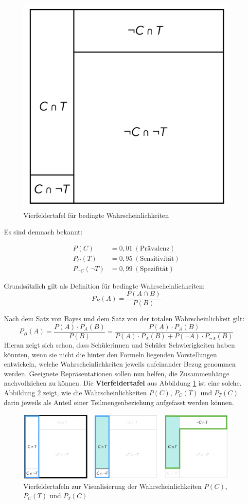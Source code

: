 \documentclass[
]{scrbook}
\theoremstyle{definition}
\theoremstyle{definition}
\theoremstyle{definition}
\theoremstyle{definition}
\theoremstyle{remark}
\begin{document}
\begin{figure}

{\centering \includegraphics[width=0.5\linewidth]{pictures/12-Vierfeld} 

}

\caption{Vierfeldertafel für bedingte Wahrscheinlichkeiten}\label{fig:Vierfeld}
\end{figure}

Es sind demnach bekannt:

\begin{align}
P(C) &= 0,\!01 \ \mathrm{(Prävalenz)}\\
P_C(T) &= 0,\!95 \ \mathrm{(Sensitivität)}\\
P_{\neg C}(\neg T) &= 0,\!99 \ \mathrm{(Spezifität)}
\end{align}

Grundsätzlich gilt als Definition für bedingte Wahrscheinlichkeiten: \[P_B(A) = \frac{P(A\cap B)}{P(B)}\]

Nach dem Satz von Bayes und dem Satz von der totalen Wahrscheinlichkeit gilt:
\[P_B(A) = \frac{P(A)\cdot P_A(B)}{P(B)} = \frac{P(A)\cdot P_A(B)}{P(A)\cdot P_A(B)+P(\neg A)\cdot P_{\neg A}(B)}\]
Hieran zeigt sich schon, dass Schülerinnen und Schüler Schwierigkeiten haben könnten, wenn sie nicht die hinter den Formeln liegenden Vorstellungen entwickeln, welche Wahrscheinlichkeiten jeweils aufeinander Bezug genommen werden. Geeignete Repräsentationen sollen nun helfen, die Zusammenhänge nachvollziehen zu können. Die \textbf{Vierfeldertafel} aus Abbildung \ref{fig:Vierfeld} ist eine solche. Abbildung \ref{fig:VierfeldEinzeln} zeigt, wie die Wahrscheinlichkeiten \(P(C)\), \(P_C(T)\) und \(P_T(C)\) darin jeweils als Anteil einer Teilmengenbeziehung aufgefasst werden können.

\begin{figure}

{\centering \includegraphics[width=0.95\linewidth]{pictures/12-VierfeldEinzeln} 

}

\caption{Vierfeldertafeln zur Visualisierung der Wahrscheinlichkeiten $P(C)$, $P_C(T)$ und $P_T(C)$}\label{fig:VierfeldEinzeln}
\end{figure}
\end{document}
